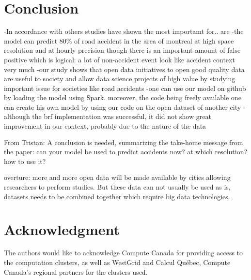 \documentclass[conference]{IEEEtran}
\newcommand{\TG}[1]{\colorlet{saved}{.}\color{orange}From Tristan: #1\color{saved}}
\begin{document}
\section*{Conclusion}
-In accordance with others studies have shown the most importamt for.. are
-the model can predict 80\% of road accident in the area of montreal at high space resolution and at hourly precision though there is an important amount of false positive which is logical: a lot of non-accident event look like accident context very much 
-our study shows that open data initiatives to open good quality data are useful to society and allow data science projects of high value by studying important issue for societies like road accidents  
-one can use our model on github by loading the model using Spark. moreover, the code being freely available one can create his own model by using our code on the open dataset of another city 
-although the brf implementation was successful, it did not show great improvement in our context, probably due to the nature of the data

\TG{A conclusion is needed, summarizing the take-home message from the paper:
can your model be used to predict accidents now? at which resolution? how to use it?}

overture: more and more open data will be made available by cities allowing researchers 
to perform studies. But these data can not usually be used as is, datasets needs to be combined
together which require big data technologies.

\section*{Acknowledgment}

The authors would like to acknowledge Compute Canada for providing access to the computation clusters, as well as WestGrid and Calcul Québec, Compute Canada's regional partners for the clusters used.



\end{document}
